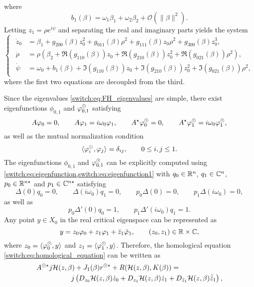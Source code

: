 %
where 
\begin{equation}
\label{switch:Eq:b_expand}
b_1(\beta)=\omega_1\beta_1+\omega_2\beta_2+ \mathcal O(\|\beta\|^2).
\end{equation}
Letting $z_{1}=\rho e^{i\psi}$ and separating the real and imaginary parts yields the system
%
\begin{equation}
\begin{cases}
\begin{aligned}
  \dot{z}_{0} & =\beta_{1}
  +g_{200}(\beta)z_{0}^{2}+g_{011}(\beta)\rho^{2}+g_{111}(\beta)z_{0}\rho^{2}+g_{300}(\beta)z_{0}^{3},\\
  \dot{\rho} & =\rho\left(\beta_{2}
    +\Re(g_{110}(\beta))z_{0}+\Re(g_{210}(\beta))z_{0}^{2}+\Re(g_{021}(\beta))\rho^{2}\right),\\
  \dot{\psi} & =\omega_{0}
  +b_{1}(\beta)+\Im(g_{110}(\beta))z_{0}+\Im(g_{210}(\beta))z_{0}^{2}+\Im(g_{021}(\beta))\rho^{2},
\end{aligned}
\end{cases}\label{switch:eq:FH_nf_phi_psi}
\end{equation}
where the first two equations are decoupled from the third.
\medskip
\par
Since the eigenvalues \cref{switch:eq:FH_eigenvalues} are simple, there exist eigenfunctions $\phi_{0,1}$ and $\varphi_{0,1}^{\odot}$ satisfying
\[
A\varphi_0=0,\qquad A\varphi_1=i\omega_0\varphi_1,\qquad A^{\star}\varphi_0^{\odot}=0,\qquad A^{\star}\varphi_1^{\odot}=i\omega_0\varphi_1^{\odot},
\]
as well as the mutual normalization condition
\[
\langle \varphi_i^{\odot},\varphi_j \rangle_{} =\delta_{ij},\qquad 0\leq i,j\leq 1.
\]
The eigenfunctions $\phi_{0,1}$ and $\varphi_{0,1}^{\odot}$ can be explicitly computed using \cref{switch:eq:eigenfunction,switch:eq:eigenfunction1} with $q_{0}\in \mathbb{R}^{n}$, $q_{1} \in \mathbb{C}^n$, $p_{0} \in \mathbb{R}^{n\star}$ and $p_{1} \in \mathbb{C}^{n\star}$ satisfying
\[
\Delta(0)q_{0}=0, \qquad \Delta(i\omega_{0})q_{1}=0,\qquad p_{0}\Delta(0)=0,\qquad p_{1}\Delta(i\omega_{0})=0,
\]
as well as
\[
  p_0\Delta'(0)q_0 = 1, \qquad p_1\Delta'(i\omega_0)q_1 = 1.
\]
Any point $y\in X_{0}$ in the real critical eigenspace can be represented as
\[
y=z_{0}\varphi_{0}+z_{1}\varphi_{1}+\bar{z}_{1}\bar{\varphi}_{1},\qquad (z_0, z_1) \in \mathbb{R} \times \mathbb{C},
\]
where $z_{0}=\langle \varphi_0^{\odot},y \rangle_{} $ and $z_1=\langle \varphi_1^{\odot},y \rangle_{}$. Therefore, the homological equation \cref{switch:eq:homological_equation} can be written as
\begin{equation}
  \label{switch:eq:FH_HOM}
  \begin{multlined}
    \SUNSTAR{A}j\mathcal{H}(z,\beta)+J_{1}(\beta)\rss+R(\mathcal{H}(z,\beta),K(\beta)) =\\
    \qquad \qquad j\left( D_{z_{0}}\mathcal{H}(z,\beta)\dot{z}_{0}+D_{z_{1}}\mathcal{H}(z,\beta)\dot{z}_{1}+D_{\bar{z}_{1}}\mathcal{H}(z,\beta)\dot{\bar{z}}_{1}\right),
  \end{multlined}
\end{equation}
